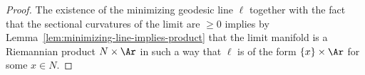 \begin{proof}
The existence of the minimizing geodesic line $\ell$ together with
the fact that the sectional curvatures of the limit are $\ge 0$
implies by Lemma~\ref{lem:minimizing-line-implies-product} that the limit manifold is a Riemannian
product $N\times \Ar$ in such a way that $\ell$ is of the form
$\{x\}\times \Ar$ for some $x\in N$.
\end{proof}
